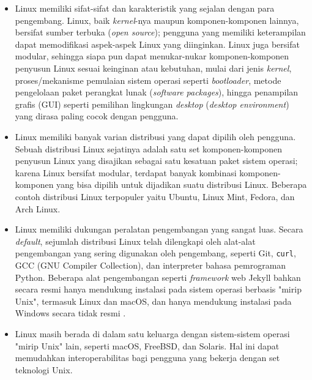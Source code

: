 \begin{itemize}
    \item Linux memiliki sifat-sifat dan karakteristik yang sejalan dengan para pengembang. Linux, baik \textit{kernel}-nya maupun komponen-komponen lainnya, bersifat sumber terbuka (\textit{open source}); pengguna yang memiliki keterampilan dapat memodifikasi aspek-aspek Linux yang diinginkan. Linux juga bersifat modular, sehingga siapa pun dapat menukar-nukar komponen-komponen penyusun Linux sesuai keinginan atau kebutuhan, mulai dari jenis \textit{kernel}, proses/mekanisme pemulaian sistem operasi seperti \textit{bootloader}, metode pengelolaan paket perangkat lunak (\textit{software packages}), hingga penampilan grafis (GUI) seperti pemilihan lingkungan \textit{desktop} (\textit{desktop environment}) yang dirasa paling cocok dengan pengguna.

    \item Linux memiliki banyak varian distribusi yang dapat dipilih oleh pengguna. Sebuah distribusi Linux sejatinya adalah satu set komponen-komponen penyusun Linux yang disajikan sebagai satu kesatuan paket sistem operasi; karena Linux bersifat modular, terdapat banyak kombinasi komponen-komponen yang bisa dipilih untuk dijadikan suatu distribusi Linux. Beberapa contoh distribusi Linux terpopuler yaitu Ubuntu, Linux Mint, Fedora, dan Arch Linux.

    \item Linux memiliki dukungan peralatan pengembangan yang sangat luas. Secara \textit{default}, sejumlah distribusi Linux telah dilengkapi oleh alat-alat pengembangan yang sering digunakan oleh pengembang, seperti Git, \verb|curl|, GCC (GNU Compiler Collection), dan interpreter bahasa pemrograman Python. Beberapa alat pengembangan seperti \textit{framework} web Jekyll bahkan secara resmi hanya mendukung instalasi pada sistem operasi berbasis "mirip Unix", termasuk Linux dan macOS, dan hanya mendukung instalasi pada Windows secara tidak resmi \cite{jekyll-windows-unofficially-supported}.

    \item Linux masih berada di dalam satu keluarga dengan sistem-sistem operasi "mirip Unix" lain, seperti macOS, FreeBSD, dan Solaris. Hal ini dapat memudahkan interoperabilitas bagi pengguna yang bekerja dengan set teknologi Unix.
\end{itemize}


